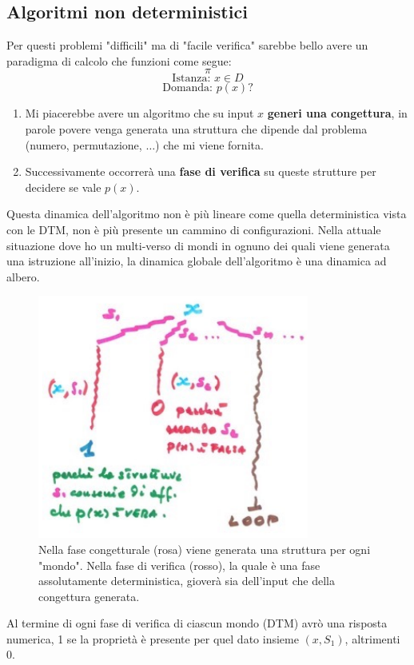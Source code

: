\documentclass{article}
\begin{document}
\subsection{Algoritmi non deterministici}
Per questi problemi "difficili" ma di "facile verifica" sarebbe bello avere un paradigma di
calcolo che funzioni come segue:
$$\pi$$
$$\text{Istanza: }x\in D$$
$$\text{Domanda: }p(x)?$$
\begin{enumerate}
    \item Mi piacerebbe avere un algoritmo che su input $x$ \textbf{generi una congettura}, in parole
          povere venga generata una struttura che dipende dal problema (numero, permutazione, $\dots$)
          che mi viene fornita.

    \item Successivamente occorrerà una \textbf{fase di verifica} su queste strutture per decidere se
          vale $p(x)$.
\end{enumerate}
Questa dinamica dell'algoritmo non è più lineare come quella deterministica vista
con le DTM, non è più presente un cammino di configurazioni. Nella attuale situazione
dove ho un multi-verso di mondi in ognuno dei quali viene generata una istruzione
all'inizio, la dinamica globale dell'algoritmo è una dinamica ad albero.
\begin{figure}[H]
    \centering
    \includegraphics[scale=0.7]{images/dinamica_albero.png}
    \caption{Nella fase congetturale (rosa) viene generata una struttura per ogni "mondo".
        Nella fase di verifica (rosso), la quale è una fase assolutamente deterministica,
        gioverà sia dell'input che della congettura generata.}
\end{figure}
Al termine di ogni fase di verifica di ciascun mondo (DTM) avrò una risposta numerica,
1 se la proprietà è presente per quel dato insieme $(x,S_1)$, altrimenti 0.
\end{document}
